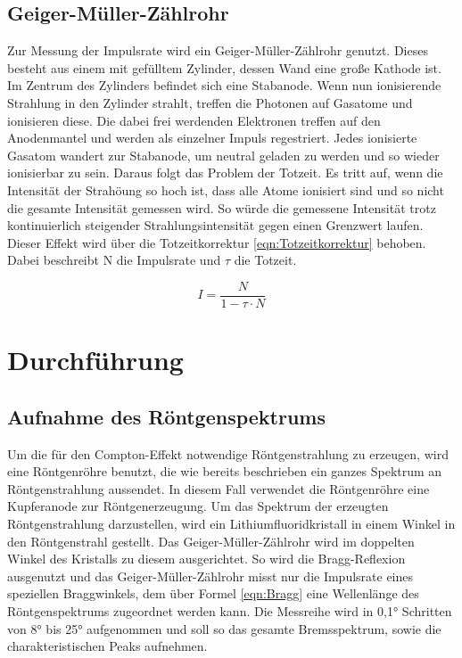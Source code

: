 \documentclass[titlepage = firstcover]{scrartcl}
\begin{document}
        \subsection{Geiger-Müller-Zählrohr}
        Zur Messung der Impulsrate wird ein Geiger-Müller-Zählrohr genutzt. Dieses besteht aus einem mit gefülltem Zylinder, dessen Wand eine große
        Kathode ist. Im Zentrum des Zylinders befindet sich eine Stabanode. Wenn nun ionisierende Strahlung in den Zylinder strahlt, treffen die Photonen
        auf Gasatome und ionisieren diese. Die dabei frei werdenden Elektronen treffen auf den Anodenmantel und werden als einzelner Impuls regestriert. Jedes
        ionisierte Gasatom wandert zur Stabanode, um neutral geladen zu werden und so wieder ionisierbar zu sein. Daraus folgt das Problem der Totzeit. Es 
        tritt auf, wenn die Intensität der Strahöung so hoch ist, dass alle Atome ionisiert sind und so nicht die gesamte Intensität gemessen wird. So würde die
        gemessene Intensität trotz kontinuierlich steigender Strahlungsintensität gegen einen Grenzwert laufen. Dieser Effekt wird über die Totzeitkorrektur 
        \ref{eqn:Totzeitkorrektur} behoben. Dabei beschreibt N die Impulsrate und $\tau$ die Totzeit.
        
        \begin{equation}
            I = \frac{N}{1-\tau \cdot N}
            \label{eqn:Totzeitkorrektur}
        \end{equation}
        

    \section{Durchführung}
        \subsection{Aufnahme des Röntgenspektrums}
        Um die für den Compton-Effekt notwendige Röntgenstrahlung zu erzeugen, wird eine Röntgenröhre benutzt, die wie bereits beschrieben ein ganzes 
        Spektrum an Röntgenstrahlung aussendet. In diesem Fall verwendet die Röntgenröhre eine Kupferanode zur Röntgenerzeugung. Um das Spektrum der 
        erzeugten Röntgenstrahlung darzustellen, wird ein Lithiumfluoridkristall in einem Winkel in den Röntgenstrahl gestellt. Das Geiger-Müller-Zählrohr
        wird im doppelten Winkel des Kristalls zu diesem ausgerichtet. So wird die Bragg-Reflexion ausgenutzt und das Geiger-Müller-Zählrohr misst nur die
        Impulsrate eines speziellen Braggwinkels, dem über Formel \ref{eqn:Bragg} eine Wellenlänge des Röntgenspektrums zugeordnet werden kann. Die Messreihe
        wird in 0,1° Schritten von 8° bis 25° aufgenommen und soll so das gesamte Bremsspektrum, sowie die charakteristischen Peaks aufnehmen.
        
\end{document}
